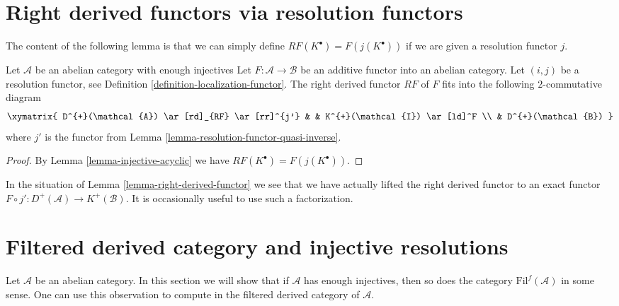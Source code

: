 \section{Right derived functors via resolution functors}
\label{section-right-derived-functor-via-resolutions}

\noindent
The content of the following lemma is that we can simply define
$RF(K^\bullet) = F(j(K^\bullet))$ if we are given a resolution functor $j$.

\begin{lemma}
\label{lemma-right-derived-functor}
Let $\mathcal{A}$ be an abelian category with enough injectives
Let $F : \mathcal{A} \to \mathcal{B}$ be an additive functor into
an abelian category. Let $(i, j)$ be a resolution functor, see
Definition \ref{definition-localization-functor}.
The right derived functor $RF$ of $F$ fits into the following
$2$-commutative diagram
$$
\xymatrix{
D^{+}(\mathcal{A}) \ar[rd]_{RF} \ar[rr]^{j'} & &
K^{+}(\mathcal{I}) \ar[ld]^F \\
& D^{+}(\mathcal{B})
}
$$
where $j'$ is the functor from
Lemma \ref{lemma-resolution-functor-quasi-inverse}.
\end{lemma}

\begin{proof}
By
Lemma \ref{lemma-injective-acyclic}
we have $RF(K^\bullet) = F(j(K^\bullet))$.
\end{proof}

\begin{remark}
\label{remark-right-derived-functor}
In the situation of
Lemma \ref{lemma-right-derived-functor}
we see that we have actually lifted the right derived
functor to an exact functor
$F \circ j' : D^{+}(\mathcal{A}) \to K^{+}(\mathcal{B})$.
It is occasionally useful to use such a factorization.
\end{remark}








\section{Filtered derived category and injective resolutions}
\label{section-filtered-derived}

\noindent
Let $\mathcal{A}$ be an abelian category. In this section we will show
that if $\mathcal{A}$ has enough injectives, then so does
the category $\text{Fil}^f(\mathcal{A})$ in some sense. One
can use this observation to compute in the filtered derived category
of $\mathcal{A}$.

